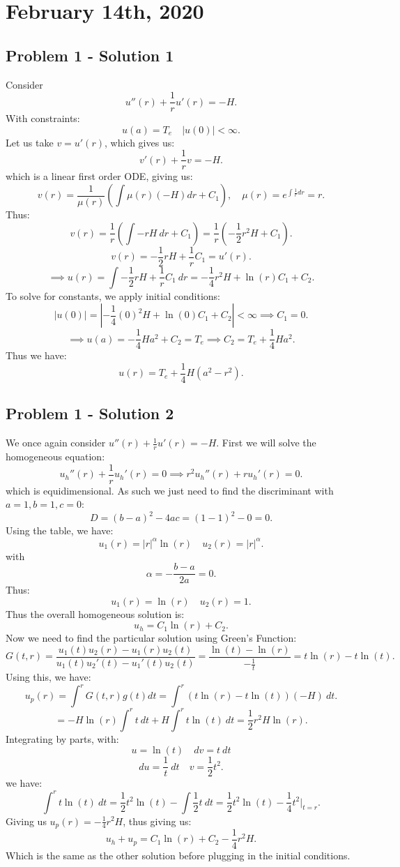 \documentclass[../main/main.tex]{subfiles}
\begin{document}
\section{February 14th, 2020}
\subsection{Problem 1 - Solution 1}
Consider \[
	u''(r) + \frac{1}{r}u'(r) = -H
.\] With constraints: \[
u(a) = T_e\quad |u(0)| < \infty
.\] Let us take $v=u'(r)$, which gives us:  \[
v'(r) + \frac{1}{r}v = -H
.\]  which is a linear first order ODE, giving us: \[
v(r) = \frac{1}{\mu(r)}\left( \int \mu(r) (-H) dr + C_1 \right), \quad\mu(r) = e^{\int \frac{1}{r}dr} = r
.\] Thus: \[
v(r) = \frac{1}{r}\left( \int-rH~dr +C_1 \right)  = \frac{1}{r}\left( -\frac{1}{2}r^2H+C_1 \right) 
.\] \[
v(r) =- \frac{1}{2}rH + \frac{1}{r}C_1 = u'(r)
.\] \[
\implies u(r) = \int -\frac{1}{2}rH+\frac{1}{r}C_1~dr = -\frac{1}{4}r^2H+\ln(r)C_1+C_2
.\] To solve for constants, we apply initial conditions: \[
|u(0)| = |-\frac{1}{4}(0)^2H+\ln(0)C_1+C_2|<\infty \implies C_1=0
.\] \[
\implies u(a) = -\frac{1}{4}Ha^2+C_2 = T_e \implies C_2 = T_e+\frac{1}{4}Ha^2
.\] Thus we have: \[
u(r) = T_e+\frac{1}{4}H(a^2-r^2)
.\] 

\subsection{Problem 1 - Solution 2}
We once again consider $u''(r)+\frac{1}{r}u'(r)=-H$. First we will solve the homogeneous equation: \[
	u_h''(r)+\frac{1}{r}u_h'(r)=0 \implies r^2 u_h''(r)+r u_h'(r) = 0
.\] which is equidimensional. As such we just need to find the discriminant with $a=1, b=1, c=0$: \[
D=(b-a)^2-4ac = (1-1)^2-0=0
.\] Using the table, we have: \[
u_1(r) = |r|^{\alpha}\ln(r)\quad u_2(r) = |r|^{\alpha}
.\] with  \[
\alpha=-\frac{b-a}{2a}=0
.\] Thus: \[
u_1(r) = \ln(r)\quad u_2(r) = 1
.\] Thus the overall homogeneous solution is: \[
u_h= C_1\ln(r) + C_2
.\] Now we need to find the particular solution using Green's Function: \[
G(t,r) = \frac{u_1(t)u_2(r)-u_1(r)u_2(t)}{u_1(t)u_2'(t)-u_1'(t)u_2(t)} = \frac{\ln(t)-\ln(r)}{-\frac{1}{t}}=t\ln(r)-t\ln(t)
.\] Using this, we have: \[
u_p(r) = \int^r G(t,r) g(t) dt = \int^r(t\ln(r)-t\ln(t))(-H)~dt
.\] \[
= -H\ln(r)\int^rt~dt + H\int^rt\ln(t)~dt = \frac{1}{2}r^2H\ln(r)
.\] Integrating by parts, with: \[
u=\ln(t) \quad dv=t~dt
\] \[
du=\frac{1}{t}~dt \quad v=\frac{1}{2}t^2
.\] 
we have: \[
\int^r t\ln(t) ~dt = \frac{1}{2}t^2\ln(t)-\int \frac{1}{2}t~dt  = \frac{1}{2}t^2\ln(t) -\frac{1}{4}t^2\bigg\rvert_{t=r}
.\] 
Giving us $u_p(r) = -\frac{1}{4}r^2H$, thus giving us: \[
	u_h+u_p = C_1\ln(r) + C_2-\frac{1}{4}r^2H
.\] Which is the same as the other solution before plugging in the initial conditions.
\end{document}
